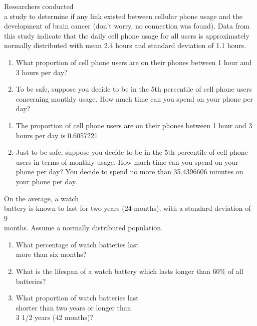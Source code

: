 \documentclass[11pt]{book}\usepackage[]{graphicx}\usepackage[]{color}
\begin{document}
\begin{exercises}
  \begin{exercise} %

Researchers conducted \\ a  study to determine if any link existed  between cellular phone usage and the development of brain cancer (don't worry, no connection was found).  Data from this study indicate that the daily cell phone usage for all users is approximately normally distributed with mean 2.4 hours and standard deviation of 1.1  hours.

	\begin{enumerate}
	\item What proportion of cell phone users are on their phones between 1 hour
and 3 hours per day?
  \item To be safe, suppose you decide to be in the 5th percentile of
cell phone users concerning monthly usage.  How much time can you spend on your phone per day?
	\end{enumerate}

	\end{exercise}
	\begin{solution}  %


\begin{enumerate}
	\item The proportion of cell phone users are on their phones between 1 hour
and 3 hours per day is 0.6057221
  \item Just to be safe, suppose you decide to be in the 5th percentile of
cell phone users in terms of monthly usage.  How much time can you spend on your phone per day? You decide to spend no more than 35.4396606 minutes on your phone per day.
	\end{enumerate}
	\end{solution}

  \begin{exercise} %



On the average, a watch \\ battery is known to last for two years (24-months), with a standard deviation of 9 \\ months. Assume a normally distributed population.

 \begin{enumerate}
	\item What percentage of watch batteries last \\ more than six months?
	\item What is the lifespan of a watch battery which lasts longer than 60\% of all batteries?
	\item What proportion of watch batteries last \\ shorter than two years or longer than \\ 3 1/2 years (42 months)?
 \end{enumerate}


\end{exercise}
\end{exercises}
\end{document}
